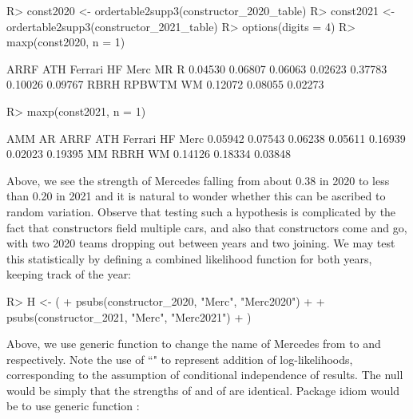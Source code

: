 \documentclass[article]{jss}
\begin{document}
\begin{Schunk}
\begin{Sinput}
R> const2020 <- ordertable2supp3(constructor_2020_table)
R> const2021 <- ordertable2supp3(constructor_2021_table)
R> options(digits = 4)
R> maxp(const2020, n = 1)
\end{Sinput}
\begin{Soutput}
   ARRF     ATH Ferrari      HF    Merc      MR       R 
0.04530 0.06807 0.06063 0.02623 0.37783 0.10026 0.09767 
   RBRH  RPBWTM      WM 
0.12072 0.08055 0.02273 
\end{Soutput}
\begin{Sinput}
R> maxp(const2021, n = 1)
\end{Sinput}
\begin{Soutput}
    AMM      AR    ARRF     ATH Ferrari      HF    Merc 
0.05942 0.07543 0.06238 0.05611 0.16939 0.02023 0.19395 
     MM    RBRH      WM 
0.14126 0.18334 0.03848 
\end{Soutput}
\end{Schunk}

Above, we see the strength of Mercedes falling from about 0.38 in 2020
to less than 0.20 in 2021 and it is natural to wonder whether this can
be ascribed to random variation.  Observe that testing such a
hypothesis is complicated by the fact that constructors field multiple
cars, and also that constructors come and go, with two 2020 teams
dropping out between years and two joining.  We may test this
statistically by defining a combined likelihood function for both
years, keeping track of the year:

\begin{Schunk}
\begin{Sinput}
R> H <- (
+       psubs(constructor_2020, "Merc", "Merc2020") +
+       psubs(constructor_2021, "Merc", "Merc2021")
+      )
\end{Sinput}
\end{Schunk}

Above, we use generic function  to change the name of
Mercedes from  to  and 
respectively.  Note the use of ``\code{+}" to represent addition of
log-likelihoods, corresponding to the assumption of conditional
independence of results.  The null would be simply that the strengths
of  and of  are identical.  Package
idiom would be to use generic function :
\end{document}
